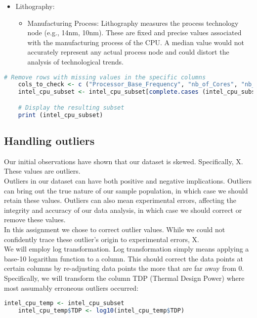 \begin{itemize}
    \item Lithography:
    \begin{itemize}
        \item Manufacturing Process: Lithography measures the process technology node (e.g., 14nm, 10nm). These are fixed and precise values associated with the manufacturing process of the CPU. A median value would not accurately represent any actual process node and could distort the analysis of technological trends.
    \end{itemize}
\end{itemize}

\begin{lstlisting}[language=R]
    # Remove rows with missing values in the specific columns
    cols_to_check <- c ("Processor_Base_Frequency", "nb_of_Cores", "nb_of_Threads", "TDP", "Lithography")
    intel_cpu_subset <- intel_cpu_subset[complete.cases (intel_cpu_subset[, cols_to_check]), ]

    # Display the resulting subset
    print (intel_cpu_subset)
\end{lstlisting}

\subsection{Handling outliers}
Our initial observations have shown that our dataset is skewed. Specifically, X. These values are outliers.\\

Outliers in our dataset can have both positive and negative implications. Outliers can bring out the true nature of our sample population, in which case we should retain these values. Outliers can also mean experimental errors, affecting the integrity and accuracy of our data analysis, in which case we should correct or remove these values.\\

In this assignment we chose to correct outlier values. While we could not confidently trace these outlier's origin to experimental errors, X.\\

We will employ log transformation. Log transformation simply means applying a base-10 logarithm function to a column. This should correct the data points at certain columns by re-adjusting data points the more that are far away from 0. Specifically, we will transform the column TDP (Thermal Design Power) where most assumably erroneous outliers occurred:
\begin{lstlisting}[language=R]
    intel_cpu_temp <- intel_cpu_subset
    intel_cpu_temp$TDP <- log10(intel_cpu_temp$TDP)
\end{lstlisting}

\newpage
